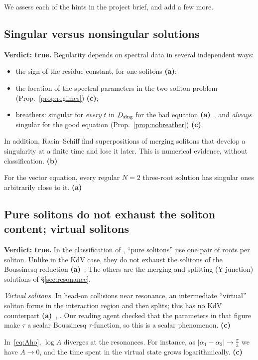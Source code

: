 \documentclass[11pt,a4paper]{article}
\newcommand{\La}{\textsf{\textbf{(a)}}}
\newcommand{\Lb}{\textsf{\textbf{(b)}}}
\newcommand{\Lc}{\textsf{\textbf{(c)}}}
\theoremstyle{remark}
\begin{document}
We assess each of the hints in the project brief, and add a few more.

\subsection{Singular versus nonsingular solutions}

\textbf{Verdict: true.} Regularity depends on spectral data in several independent ways:
\begin{itemize}
\item the sign of the residue constant, for one-solitons \cite[Lemma A.3]{CL-SOL} \La;
\item the location of the spectral parameters in the two-soliton problem (Prop.~\ref{prop:regimes}) \Lc;
\item breathers: singular for \emph{every} $t$ in $D_{\rm sing}$ for the bad equation \La~\cite{CL-SOL}, and \emph{always} singular for the good equation (Prop.~\ref{prop:nobreather}) \Lc.
\end{itemize}

In addition, Rasin--Schiff find superpositions of merging solitons that develop a singularity at a finite time and lose it later. This is numerical evidence, without classification. \Lb~\cite[Fig.\,8]{RS}

For the vector equation, every regular $N=2$ three-root solution has singular ones arbitrarily close to it. \La~\cite[Prop.\,3.7]{DMHC}

\subsection{Pure solitons do not exhaust the soliton content; virtual solitons}

\textbf{Verdict: true.} In the classification of \cite{DMHC}, ``pure solitons'' use one pair of roots per soliton. Unlike in the KdV case, they do not exhaust the solitons of the Boussinesq reduction \La~\cite[Intro, §3.3]{DMHC}. The others are the merging and splitting (Y-junction) solutions of \S\ref{sec:resonance}.

\emph{Virtual solitons.} In head-on collisions near resonance, an intermediate ``virtual'' soliton forms in the interaction region and then splits; this has no KdV counterpart \La~\cite[Fig.\,2]{DMHC}, \cite{HI}. Our reading agent checked that the parameters in that figure make $\tau$ a scalar Boussinesq $\tau$-function, so this is a scalar phenomenon. \Lc

In~\eqref{eq:Aho}, $\log A$ diverges at the resonances. For instance, as $|\alpha_1-\alpha_2|\to\frac\pi3$ we have $A\to0$, and the time spent in the virtual state grows logarithmically. \Lc
\end{document}

